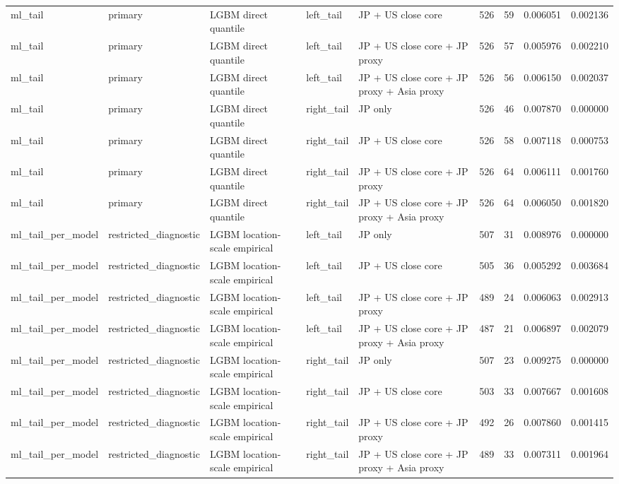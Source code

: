 \begin{tabular}{lllllrrrr}
ml\_tail & primary & LGBM direct quantile & left\_tail & JP + US close core & 526 & 59 & 0.006051 & 0.002136 \\
ml\_tail & primary & LGBM direct quantile & left\_tail & JP + US close core + JP proxy & 526 & 57 & 0.005976 & 0.002210 \\
ml\_tail & primary & LGBM direct quantile & left\_tail & JP + US close core + JP proxy + Asia proxy & 526 & 56 & 0.006150 & 0.002037 \\
ml\_tail & primary & LGBM direct quantile & right\_tail & JP only & 526 & 46 & 0.007870 & 0.000000 \\
ml\_tail & primary & LGBM direct quantile & right\_tail & JP + US close core & 526 & 58 & 0.007118 & 0.000753 \\
ml\_tail & primary & LGBM direct quantile & right\_tail & JP + US close core + JP proxy & 526 & 64 & 0.006111 & 0.001760 \\
ml\_tail & primary & LGBM direct quantile & right\_tail & JP + US close core + JP proxy + Asia proxy & 526 & 64 & 0.006050 & 0.001820 \\
ml\_tail\_per\_model & restricted\_diagnostic & LGBM location-scale empirical & left\_tail & JP only & 507 & 31 & 0.008976 & 0.000000 \\
ml\_tail\_per\_model & restricted\_diagnostic & LGBM location-scale empirical & left\_tail & JP + US close core & 505 & 36 & 0.005292 & 0.003684 \\
ml\_tail\_per\_model & restricted\_diagnostic & LGBM location-scale empirical & left\_tail & JP + US close core + JP proxy & 489 & 24 & 0.006063 & 0.002913 \\
ml\_tail\_per\_model & restricted\_diagnostic & LGBM location-scale empirical & left\_tail & JP + US close core + JP proxy + Asia proxy & 487 & 21 & 0.006897 & 0.002079 \\
ml\_tail\_per\_model & restricted\_diagnostic & LGBM location-scale empirical & right\_tail & JP only & 507 & 23 & 0.009275 & 0.000000 \\
ml\_tail\_per\_model & restricted\_diagnostic & LGBM location-scale empirical & right\_tail & JP + US close core & 503 & 33 & 0.007667 & 0.001608 \\
ml\_tail\_per\_model & restricted\_diagnostic & LGBM location-scale empirical & right\_tail & JP + US close core + JP proxy & 492 & 26 & 0.007860 & 0.001415 \\
ml\_tail\_per\_model & restricted\_diagnostic & LGBM location-scale empirical & right\_tail & JP + US close core + JP proxy + Asia proxy & 489 & 33 & 0.007311 & 0.001964 \\

\end{tabular}
